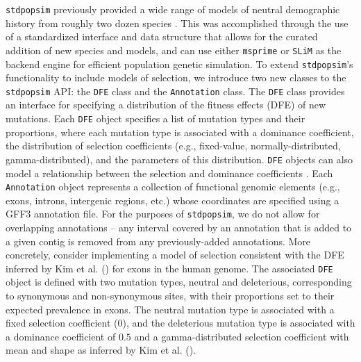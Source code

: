 \documentclass[hidelinks]{article}
\newcommand{\stdpopsim}{\texttt{stdpopsim}\xspace}
\newcommand{\slim}{\texttt{SLiM}\xspace}
\newcommand{\msprime}{\texttt{msprime}\xspace}
\begin{document}
    \stdpopsim previously provided a wide range of models of neutral
    demographic history from roughly two dozen species \citep{lauterbur2023expanding}.
    This was accomplished through the use of a standardized interface
    and data structure that allows for the curated addition of new
    species and models, and can use either
    \msprime \citep{Baumdicker2022} or \slim \citep{haller2019slim}
    as the backend engine for efficient population genetic simulation.
    To extend \stdpopsim's functionality to include models of selection,
    we introduce two new classes
    to the \stdpopsim API: the \texttt{DFE} class and the \texttt{Annotation} class.
    The \texttt{DFE} class provides an interface for specifying
    a distribution of the fitness effects (DFE) of new mutations.
    Each \texttt{DFE} object specifies a list of mutation types and
    their proportions, where
    each mutation type is associated with a dominance coefficient,
    the distribution of selection coefficients (e.g., fixed-value, normally-distributed, gamma-distributed),
    and the parameters of this distribution.
    \texttt{DFE} objects can also model a relationship between the selection and dominance coefficients \citep[][see \textbf{Methods}]{huber2018gene}.
    Each \texttt{Annotation} object represents a collection of functional
    genomic elements (e.g., exons, introns, intergenic regions, etc.)
    whose coordinates are specified using a GFF3 annotation file. 
    For the purposes of \stdpopsim, we do not allow for overlapping annotations -- 
    any interval covered by an annotation that is added to a given contig
    is removed from any previously-added annotations. 
    More concretely, consider implementing a model of selection consistent with the
    DFE inferred by Kim et al. (\citeyear{kim2017inference}) for exons in the human genome.
    The associated \texttt{DFE} object is defined with two mutation types,
    neutral and deleterious, corresponding to synonymous and non-synonymous sites,
    with their proportions set to their expected prevalence in exons.
    The neutral mutation type is associated with a fixed selection coefficient (0),
    and the deleterious mutation type is associated with a dominance coefficient of $0.5$ and
    a gamma-distributed selection coefficient
    with mean and shape as inferred by Kim et al. (\citeyear{kim2017inference}).
\end{document}
